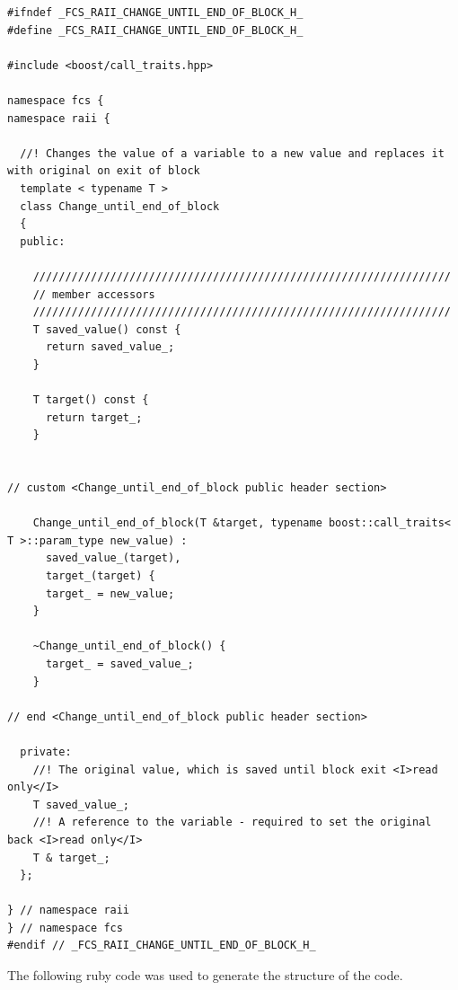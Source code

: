 \documentclass[11pt]{article}
\begin{document}
\lstset{language=C++}
\begin{lstlisting}
#ifndef _FCS_RAII_CHANGE_UNTIL_END_OF_BLOCK_H_
#define _FCS_RAII_CHANGE_UNTIL_END_OF_BLOCK_H_

#include <boost/call_traits.hpp>

namespace fcs {
namespace raii {

  //! Changes the value of a variable to a new value and replaces it with original on exit of block
  template < typename T > 
  class Change_until_end_of_block 
  {
  public:

    /////////////////////////////////////////////////////////////////
    // member accessors
    /////////////////////////////////////////////////////////////////
    T saved_value() const {
      return saved_value_;
    }

    T target() const {
      return target_;
    }

  
// custom <Change_until_end_of_block public header section>

    Change_until_end_of_block(T &target, typename boost::call_traits< T >::param_type new_value) : 
      saved_value_(target),
      target_(target) {
      target_ = new_value;
    }

    ~Change_until_end_of_block() {
      target_ = saved_value_;
    }

// end <Change_until_end_of_block public header section>

  private:
    //! The original value, which is saved until block exit <I>read only</I>
    T saved_value_;
    //! A reference to the variable - required to set the original back <I>read only</I>
    T & target_;
  };

} // namespace raii
} // namespace fcs
#endif // _FCS_RAII_CHANGE_UNTIL_END_OF_BLOCK_H_
\end{lstlisting}


\pagebreak
  The following ruby code was used to generate the structure of the code.
\end{document}
